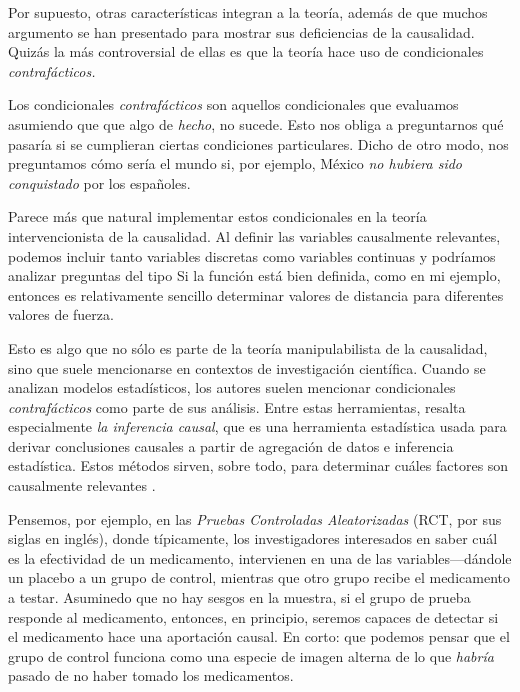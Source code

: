 Por supuesto, otras características integran a la teoría, además de que
muchos argumento se han presentado para mostrar sus deficiencias
de la causalidad. Quizás la más controversial de ellas es que la teoría
hace uso de condicionales \emph{contrafácticos.}

Los condicionales \emph{contrafácticos} son aquellos condicionales
que evaluamos asumiendo que que algo de \emph{hecho}, no sucede. Esto
nos obliga a preguntarnos qué pasaría si se cumplieran ciertas
condiciones particulares. Dicho de otro modo, nos preguntamos cómo
sería el mundo si, por ejemplo, México \emph{no hubiera sido
conquistado} por los españoles.

Parece más que natural implementar estos condicionales en la teoría
intervencionista de la causalidad. Al definir las variables
causalmente relevantes, podemos incluir tanto variables discretas
como variables continuas y podríamos analizar preguntas del tipo
 Si la función está bien definida, como en
mi ejemplo, entonces es relativamente sencillo determinar valores de
distancia para diferentes valores de fuerza.

Esto es algo que no sólo es parte de la teoría manipulabilista de la
causalidad, sino que suele mencionarse en contextos de investigación
científica. Cuando se analizan modelos estadísticos, los autores
suelen mencionar condicionales \emph{contrafácticos} como parte de
sus análisis. Entre estas herramientas, resalta especialmente
\emph{la inferencia causal}, que es una herramienta estadística usada
para derivar conclusiones causales a partir de agregación de datos e
inferencia estadística. Estos métodos sirven, sobre todo, para
determinar cuáles factores son causalmente relevantes \parencite{Pearl2016, Pearl2018}.

Pensemos, por ejemplo, en las \emph{Pruebas Controladas
Aleatorizadas} (RCT, por sus siglas en inglés), donde típicamente,
los investigadores interesados en saber cuál es la efectividad de un
medicamento, intervienen en una de las variables---dándole un placebo
a un grupo de control, mientras que otro grupo recibe el medicamento
a testar. Asuminedo que no hay sesgos en la muestra, si el grupo de
prueba responde al medicamento, entonces, en principio, seremos
capaces de detectar si el medicamento hace una aportación causal. En
corto: que podemos pensar que el grupo de control funciona como una
especie de imagen alterna de lo que \emph{habría} pasado de no haber
tomado los medicamentos.

